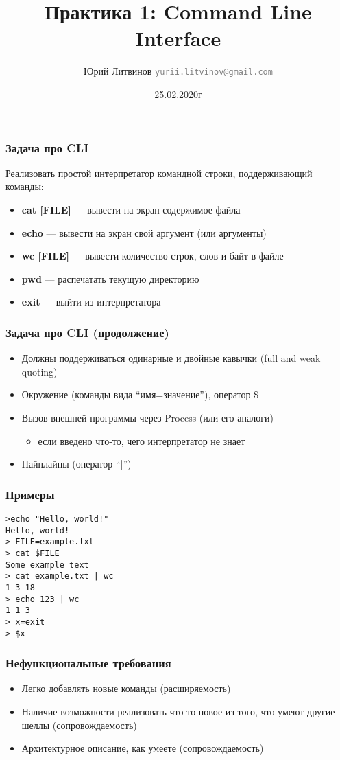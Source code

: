\documentclass[xetex,mathserif,serif]{beamer}
\title{Практика 1: Command Line Interface}
\author[Юрий Литвинов]{Юрий Литвинов \newline \textcolor{gray}{\small\texttt{yurii.litvinov@gmail.com}}}
\date{25.02.2020г}
\begin{document}
	\frame{\titlepage}

	\begin{frame}
		\frametitle{Задача про CLI}
		Реализовать простой интерпретатор командной строки, поддерживающий команды:
		\begin{itemize}
			\item \textbf{cat [FILE]} --- вывести на экран содержимое файла
			\item \textbf{echo} --- вывести на экран свой аргумент (или аргументы)
			\item \textbf{wc [FILE]} --- вывести количество строк, слов и байт в файле
			\item \textbf{pwd} --- распечатать текущую директорию
			\item \textbf{exit} --- выйти из интерпретатора
		\end{itemize}
	\end{frame}
	
	\begin{frame}
		\frametitle{Задача про CLI (продолжение)}
		\begin{itemize}
			\item Должны поддерживаться одинарные и двойные кавычки (full and weak quoting)
			\item Окружение (команды вида ``имя=значение''), оператор \$
			\item Вызов внешней программы через Process (или его аналоги)
			\begin{itemize}
				\item если введено что-то, чего интерпретатор не знает
			\end{itemize}
			\item Пайплайны (оператор ``|'')
		\end{itemize}
	\end{frame}
	
	\begin{frame}[fragile]
		\frametitle{Примеры}
\begin{verbatim}
>echo "Hello, world!"
Hello, world!
> FILE=example.txt
> cat $FILE
Some example text
> cat example.txt | wc
1 3 18
> echo 123 | wc
1 1 3
> x=exit
> $x
		\end{verbatim}
	\end{frame}

	\begin{frame}
		\frametitle{Нефункциональные требования}
		\begin{itemize}
			\item Легко добавлять новые команды (расширяемость)
			\item Наличие возможности реализовать что-то новое из того, что умеют другие шеллы (сопровождаемость)
			\item Архитектурное описание, как умеете (сопровождаемость)
		\end{itemize}
	\end{frame}
	
\end{document}
